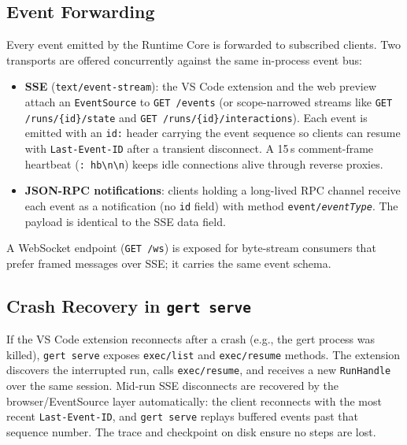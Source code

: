 \subsection{Event Forwarding}

Every event emitted by the Runtime Core is forwarded to subscribed clients. Two transports
are offered concurrently against the same in-process event bus:

\begin{itemize}
  \item \textbf{SSE} (\texttt{text/event-stream}): the VS Code extension and the web preview
        attach an \texttt{EventSource} to \texttt{GET /events} (or scope-narrowed streams
        like \texttt{GET /runs/\{id\}/state} and \texttt{GET /runs/\{id\}/interactions}).
        Each event is emitted with an \texttt{id:} header carrying the event sequence so
        clients can resume with \texttt{Last-Event-ID} after a transient disconnect. A 15\,s
        comment-frame heartbeat (\texttt{:\ hb\textbackslash n\textbackslash n}) keeps idle
        connections alive through reverse proxies.
  \item \textbf{JSON-RPC notifications}: clients holding a long-lived RPC channel receive
        each event as a notification (no \texttt{id} field) with method
        \texttt{event/\textit{eventType}}. The payload is identical to the SSE data field.
\end{itemize}

A WebSocket endpoint (\texttt{GET /ws}) is exposed for byte-stream consumers that prefer
framed messages over SSE; it carries the same event schema.

\subsection{Crash Recovery in \texttt{gert serve}}

If the VS Code extension reconnects after a crash (e.g., the gert process was killed),
\texttt{gert serve} exposes \texttt{exec/list} and \texttt{exec/resume} methods. The
extension discovers the interrupted run, calls \texttt{exec/resume}, and receives a new
\texttt{RunHandle} over the same session. Mid-run SSE disconnects are recovered by the
browser/EventSource layer automatically: the client reconnects with the most recent
\texttt{Last-Event-ID}, and \texttt{gert serve} replays buffered events past that
sequence number. The trace and checkpoint on disk ensure no steps are lost.

